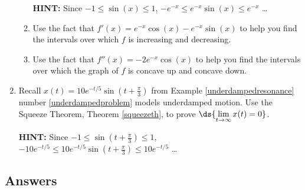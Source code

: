 \documentclass{ximera}
\begin{document}
\begin{enumerate}
\begin{enumerate}
\textbf{HINT:}   Since $-1 \leq \sin (x)  \leq 1$, $-e^{-x} \leq   e^{-x}   \sin (x)   \leq e^{-x}$ \ldots

\item  Use the fact that  $f'(x) = e^{-x} \cos(x) - e^{-x} \sin(x)$ to help you find the intervals over which $f$ is increasing and decreasing.

\item  Use the fact that $f''(x) = -2 e^{-x} \cos(x)$ to help you find the intervals over which the graph of $f$ is concave up and concave down.

\end{enumerate}

\item\label{squeezefordampedmotionexercise} Recall  $x(t) = 10e^{-t/5} \sin\left(t + \frac{\pi}{3}\right)$ from  Example \ref{underdampedresonance} number \ref{underdampedproblem} models underdamped motion. Use the Squeeze Theorem, Theorem \ref{squeezeth}, to prove $\ds{\lim_{t \rightarrow \infty} x(t) = 0}$.

\smallskip

\textbf{HINT:}  Since $-1 \leq \sin\left(t + \frac{\pi}{3}\right) \leq 1$, $-10e^{-t/5} \leq   10e^{-t/5} \sin\left(t + \frac{\pi}{3}\right) \leq 10e^{-t/5}$ \ldots


\end{enumerate}

\newpage

\subsection{Answers}
\end{document}
